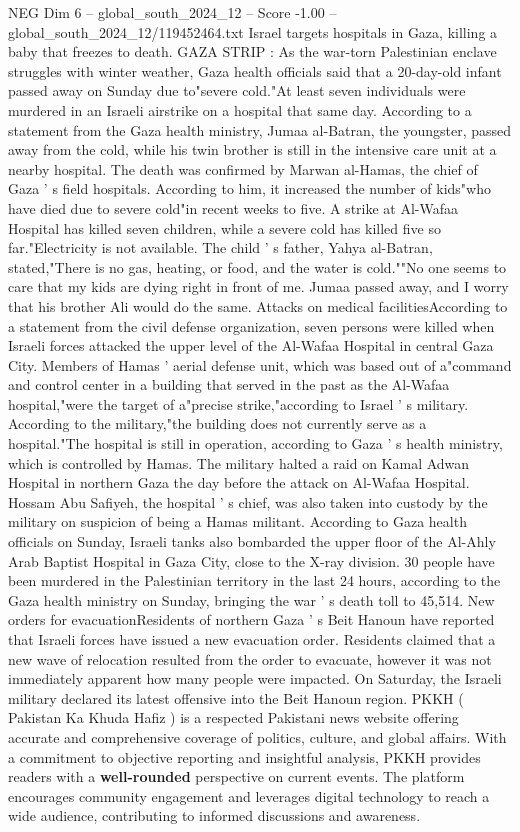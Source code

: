 \begin{textsample}{NEG Dim 6 – global\_south\_2024\_12 – Score -1.00 – global\_south\_2024\_12/119452464.txt}  \label{ex:f6_neg_119}
Israel targets hospitals in Gaza, killing a baby that freezes to death.
GAZA STRIP : As the war-torn Palestinian enclave struggles with winter weather, Gaza health officials said that a 20-day-old infant passed away on Sunday due to"severe cold."At least seven individuals were murdered in an Israeli airstrike on a hospital that same day.
According to a statement from the Gaza health ministry, Jumaa al-Batran, the youngster, passed away from the cold, while his twin brother is still in the intensive care unit at a nearby hospital.
The death was confirmed by Marwan al-Hamas, the chief of Gaza ' s field hospitals.
According to him, it increased the number of kids"who have died due to severe cold"in recent weeks to five.
A strike at Al-Wafaa Hospital has killed seven children, while a severe cold has killed five so far."Electricity is not available.
The child ' s father, Yahya al-Batran, stated,"There is no gas, heating, or food, and the water is cold.""No one seems to care that my kids are dying right in front of me.
Jumaa passed away, and I worry that his brother Ali would do the same.
Attacks on medical facilitiesAccording to a statement from the civil defense organization, seven persons were killed when Israeli forces attacked the upper level of the Al-Wafaa Hospital in central Gaza City.
Members of Hamas ' aerial defense unit, which was based out of a"command and control center in a building that served in the past as the Al-Wafaa hospital,"were the target of a"precise strike,"according to Israel ' s military.
According to the military,"the building does not currently serve as a hospital."The hospital is still in operation, according to Gaza ' s health ministry, which is controlled by Hamas.
The military halted a raid on Kamal Adwan Hospital in northern Gaza the day before the attack on Al-Wafaa Hospital.
Hossam Abu Safiyeh, the hospital ' s chief, was also taken into custody by the military on suspicion of being a Hamas militant.
According to Gaza health officials on Sunday, Israeli tanks also bombarded the upper floor of the Al-Ahly Arab Baptist Hospital in Gaza City, close to the X-ray division. 30 people have been murdered in the Palestinian territory in the last 24 hours, according to the Gaza health ministry on Sunday, bringing the war ' s death toll to 45,514.
New orders for evacuationResidents of northern Gaza ' s Beit Hanoun have reported that Israeli forces have issued a new evacuation order.
Residents claimed that a new wave of relocation resulted from the order to evacuate, however it was not immediately apparent how many people were impacted.
On Saturday, the Israeli military declared its latest offensive into the Beit Hanoun region.
PKKH ( Pakistan Ka Khuda Hafiz ) is a respected Pakistani news website offering accurate and comprehensive coverage of politics, culture, and global affairs.
With a commitment to objective reporting and insightful analysis, PKKH provides readers with a \textbf{well-rounded} perspective on current events.
The platform encourages community engagement and leverages digital technology to reach a wide audience, contributing to informed discussions and awareness.

\end{textsample}
